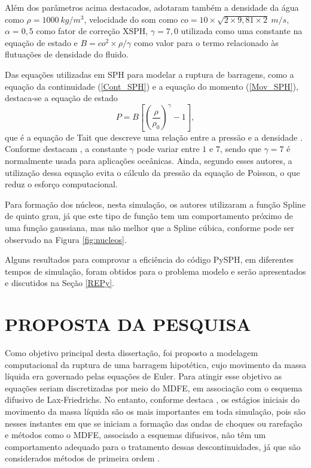 Além dos parâmetros acima destacados,  adotaram também a densidade da água como $\rho=1000 \ kg/m^{3}$, velocidade do som como $co=10 \times \sqrt{2 \times 9,81 \times 2} \ m/s$, $\alpha=0,5$ como fator de correção XSPH, $\gamma=7,0$ utilizada como uma constante na equação de estado e $B=co^2 \times \rho/ \gamma$ como valor para o termo relacionado às flutuações de densidade do fluido.

Das equações utilizadas em SPH para modelar a ruptura de barragens, como a equação da continuidade (\ref{Cont_SPH}) e a equação do momento (\ref{Mov_SPH}), destaca-se a equação de estado
\begin{equation} \label{estado}
P=B \left[\left(\frac{\rho}{\rho_0}\right)^{\gamma}-1\right],
\end{equation} 
que é a equação de Tait que descreve uma relação entre a pressão e a densidade \cite{Monaghan1994}. Conforme destacam , a constante $\gamma$ pode variar entre $1$ e $7$, sendo que $\gamma=7$ é normalmente usada para aplicações oceânicas. Ainda, segundo esses autores, a utilização dessa equação evita o cálculo da pressão da equação de Poisson, o que reduz o esforço computacional.

Para formação dos núcleos, nesta simulação, os autores utilizaram a função Spline de quinto grau, já que este tipo de função tem um comportamento próximo de uma função gaussiana, mas não melhor que a Spline cúbica, conforme pode ser observado na Figura \ref{fig:nucleos}.

Alguns resultados para comprovar a eficiência do código PySPH, em diferentes tempos de simulação, foram obtidos para o problema modelo e serão apresentados  e discutidos na Seção \ref{REPy}. 


      

\section{PROPOSTA DA PESQUISA} \label{proposta}

Como objetivo principal desta dissertação, foi proposto a modelagem computacional da ruptura de uma barragem hipotética, cujo movimento da massa líquida era governado pelas equações de Euler. Para atingir esse objetivo as equações seriam discretizadas por meio do MDFE, em associação com o esquema difusivo de Lax-Friedrichs. No entanto, conforme destaca , os estágios iniciais do movimento da massa líquida são os mais importantes em toda simulação, pois são nesses instantes em que se iniciam a formação das ondas de choques ou rarefação e métodos como o MDFE, associado a esquemas difusivos, não têm um comportamento adequado para o tratamento dessas descontinuidades, já que são considerados métodos de primeira ordem \cite{Crossley}.

